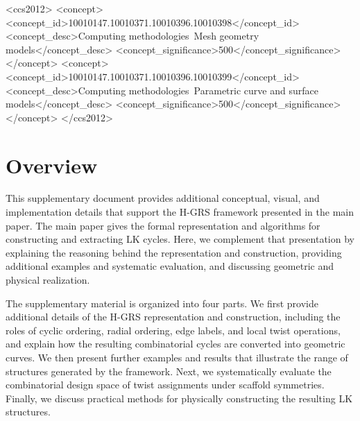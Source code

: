 \documentclass[acmtog]{acmart}
\begin{document}
\begin{CCSXML}
<ccs2012>
   <concept>
       <concept_id>10010147.10010371.10010396.10010398</concept_id>
       <concept_desc>Computing methodologies~Mesh geometry models</concept_desc>
       <concept_significance>500</concept_significance>
       </concept>
   <concept>
       <concept_id>10010147.10010371.10010396.10010399</concept_id>
       <concept_desc>Computing methodologies~Parametric curve and surface models</concept_desc>
       <concept_significance>500</concept_significance>
       </concept>
 </ccs2012>
\end{CCSXML}


\maketitle

\section*{Overview}


This supplementary document provides additional conceptual, visual, and implementation details that support the H-GRS framework presented in the main paper. The main paper gives the formal representation and algorithms for constructing and extracting LK cycles. Here, we complement that presentation by explaining the reasoning behind the representation and construction, providing additional examples and systematic evaluation, and discussing geometric and physical realization.

The supplementary material is organized into four parts. We first provide additional details of the H-GRS representation and construction, including the roles of cyclic ordering, radial ordering, edge labels, and local twist operations, and explain how the resulting combinatorial cycles are converted into geometric curves. We then present further examples and results that illustrate the range of structures generated by the framework. Next, we systematically evaluate the combinatorial design space of twist assignments under scaffold symmetries. Finally, we discuss practical methods for physically constructing the resulting LK structures.
\end{document}
